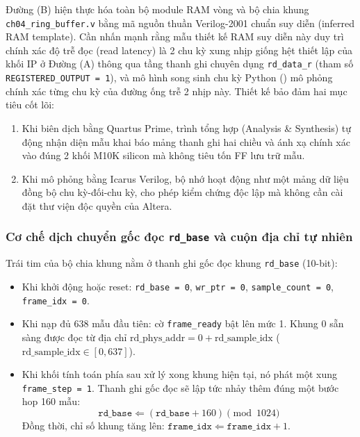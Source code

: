 Đường (B) hiện thực hóa toàn bộ module RAM vòng và bộ chia khung \texttt{ch04\_ring\_buffer.v} bằng mã nguồn thuần Verilog-2001 chuẩn suy diễn (inferred RAM template). Cần nhấn mạnh rằng mẫu thiết kế RAM suy diễn này duy trì chính xác độ trễ đọc (read latency) là 2 chu kỳ xung nhịp giống hệt thiết lập của khối IP ở Đường (A) thông qua tầng thanh ghi chuyên dụng \texttt{rd\_data\_r} (tham số \texttt{REGISTERED\_OUTPUT = 1}), và mô hình song sinh chu kỳ Python () mô phỏng chính xác từng chu kỳ của đường ống trễ 2 nhịp này. Thiết kế bảo đảm hai mục tiêu cốt lõi:
\begin{enumerate}[leftmargin=1.5em, itemsep=2pt]
    \item Khi biên dịch bằng Quartus Prime, trình tổng hợp (Analysis \& Synthesis) tự động nhận diện mẫu khai báo mảng thanh ghi hai chiều và ánh xạ chính xác vào đúng 2 khối M10K silicon mà không tiêu tốn FF lưu trữ mẫu.
    \item Khi mô phỏng bằng Icarus Verilog, bộ nhớ hoạt động như một mảng dữ liệu đồng bộ chu kỳ-đối-chu kỳ, cho phép kiểm chứng độc lập mà không cần cài đặt thư viện độc quyền của Altera.
\end{enumerate}

\subsubsection*{Cơ chế dịch chuyển gốc đọc \texttt{rd\_base} và cuộn địa chỉ tự nhiên}
Trái tim của bộ chia khung nằm ở thanh ghi gốc đọc khung \texttt{rd\_base} (10-bit):
\begin{itemize}[leftmargin=1.5em, itemsep=2pt]
    \item Khi khởi động hoặc reset: \texttt{rd\_base = 0}, \texttt{wr\_ptr = 0}, \texttt{sample\_count = 0}, \texttt{frame\_idx = 0}.
    \item Khi nạp đủ 638 mẫu đầu tiên: cờ \texttt{frame\_ready} bật lên mức 1. Khung 0 sẵn sàng được đọc từ địa chỉ $\text{rd\_phys\_addr} = 0 + \text{rd\_sample\_idx}$ ($\text{rd\_sample\_idx} \in [0, 637]$).
    \item Khi khối tính toán phía sau xử lý xong khung hiện tại, nó phát một xung \texttt{frame\_step = 1}. Thanh ghi gốc đọc sẽ lập tức nhảy thêm đúng một bước hop 160 mẫu:
    \begin{equation}
    \texttt{rd\_base} \Leftarrow (\texttt{rd\_base} + 160) \pmod{1024}
    \end{equation}
    Đồng thời, chỉ số khung tăng lên: $\texttt{frame\_idx} \Leftarrow \texttt{frame\_idx} + 1$.
\end{itemize}

